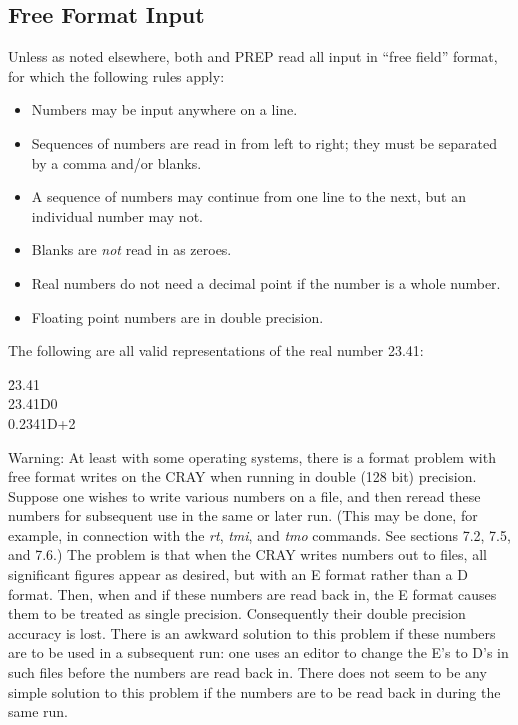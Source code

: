 \subsection{Free Format Input} 

     Unless as noted elsewhere, both \Mary and PREP read all input in
``free field'' format, for which the following rules apply:
\begin{itemize}
     \item  Numbers may be input anywhere on a line.

     \item  Sequences of numbers are read in from left to right; they must be
         separated by a comma and/or blanks.

     \item  A sequence of numbers may continue from one line to the next, but
         an individual number may not.

     \item  Blanks are {\em not} read in as zeroes.

     \item  Real numbers do not need a decimal point if the number is a whole
         number.

     \item  Floating point numbers are in double precision.
\end{itemize}
The following are all valid representations of the real number 23.41:
\begin{tabbing}
\hspace{1.75in}\=23.41 \\
              \>23.41D0         \\
              \>0.2341D+2
\end{tabbing}
Warning: At least with some operating systems, there is a format problem with free format writes on the CRAY when running in double (128 bit) precision.  Suppose one wishes to write various numbers on a file, and then reread these numbers for subsequent use in the same or later \Mary run.  (This may be done, for example, in connection with the {\em rt}, {\em tmi}, and {\em tmo } commands.  See sections 7.2, 7.5, and 7.6.)  The problem is that when the CRAY writes numbers out to files, all significant figures appear as desired, but with an E format rather than a D format.  Then, when and if these numbers are read back in, the E format causes them to be treated as single precision. Consequently their double precision accuracy is lost.  There is an awkward solution to this problem if these numbers are to be used in a subsequent \Mary run:  one uses an editor to change the E's to D's in such files before the numbers are read back in.  There does not seem to be any simple solution to this problem if the numbers are to be read back in during the same \Mary run.

